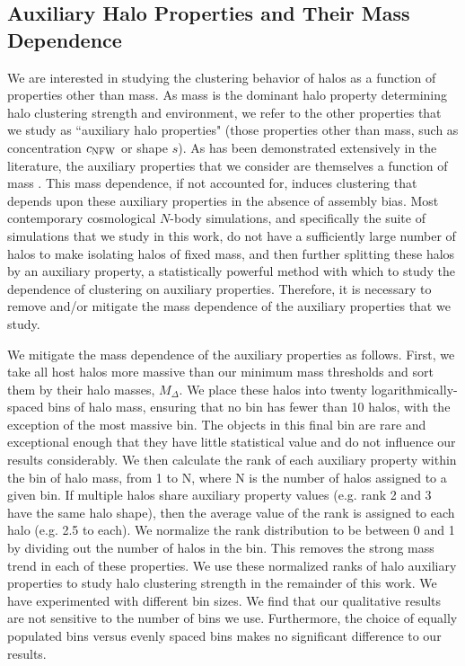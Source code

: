 \documentclass[usenatbib,fleqn]{mnras}
\begin{document}
\subsection{Auxiliary Halo Properties and Their Mass Dependence}
\label{subsection:properties}

We are interested in studying the clustering behavior of halos as a function of 
properties other than mass. As mass is the dominant halo property determining halo
clustering strength and environment, we refer to the other properties that we study as 
``auxiliary halo properties" (those properties other than mass, such as concentration 
$c_{\rm NFW}$ or shape $s$). As has been demonstrated extensively in the literature, 
the auxiliary properties that we consider are themselves 
a function of mass \citep{bullock_etal02,allgood_etal06, duffy_etal08, despali_etal16}. 
This mass dependence, if not accounted for, induces clustering that depends upon these auxiliary properties in the absence of assembly bias. 
Most contemporary cosmological $N$-body simulations, and specifically the suite of simulations 
that we study in this work, do not have a sufficiently large number of halos to make isolating halos 
of fixed mass, and then further splitting these halos by an auxiliary property, a statistically 
powerful method with which to study the dependence of clustering on auxiliary properties. 
Therefore, it is necessary to remove and/or mitigate the mass dependence of the auxiliary 
properties that we study. 

We mitigate the mass dependence of the auxiliary properties as follows. First, 
we take all host halos more massive than our minimum mass thresholds and sort them by 
their halo masses, $M_{\Delta}$. We place these halos into twenty logarithmically-spaced bins 
of halo mass, ensuring that no bin has fewer than 10 halos, with the exception of the most massive bin. The objects in this final bin are rare and exceptional enough that they have little statistical value and do not influence our results considerably. 
We then calculate the rank of each auxiliary property within the bin of halo mass, from 1 to N, where N is the number of halos assigned to a given bin. If multiple halos share auxiliary property values (e.g. rank 2 and 3 have the same halo shape), then the average value of the rank is assigned to each halo (e.g. 2.5 to each). We normalize the rank distribution to be between 0 and 1 by dividing out the number of halos in the bin. This removes the strong mass trend in each of these properties. We use these normalized ranks of halo auxiliary properties to study halo clustering strength in the remainder of this work. We have experimented with different bin sizes. We find that our qualitative results are not sensitive to the number of bins we use. Furthermore, the choice of equally populated bins versus evenly spaced bins makes no significant difference to our results.
\end{document}
